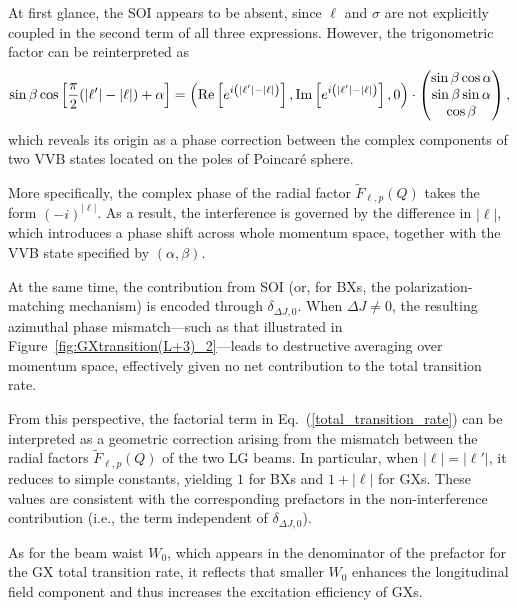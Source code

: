 At first glance, the SOI appears to be absent, since $\ell$ and $\sigma$ are not explicitly coupled in the second term of all three expressions. However, the trigonometric factor can be reinterpreted as
\begin{equation}
\sin\beta\cos\left[\frac{\pi}{2}(|\ell'|-|\ell|)+\alpha\right]
=
\begin{pmatrix}
{\rm Re}\left[e^{i\left(|\ell'|-|\ell|\right)}\right], 
{\rm Im}\left[e^{i\left(|\ell'|-|\ell|\right)}\right],
0
\end{pmatrix}
\cdot
\begin{pmatrix}
\sin\beta\cos\alpha\\
\sin\beta\sin\alpha\\
\cos\beta
\end{pmatrix},
\end{equation}
which reveals its origin as a phase correction between the complex components of two VVB states located on the poles of Poincar\'e sphere.

More specifically, the complex phase of the radial factor $\tilde{F}_{\ell,p}(Q)$ takes the form $(-i)^{|\ell|}$. As a result, the interference is governed by the difference in $|\ell|$, which introduces a phase shift across whole momentum space, together with the VVB state specified by $(\alpha,\beta)$.

At the same time, the contribution from SOI (or, for BXs, the polarization-matching mechanism) is encoded through $\delta_{\Delta J, 0}$. When $\Delta J \neq 0$, the resulting azimuthal phase mismatch—such as that illustrated in Figure~\ref{fig:GXtransition(L+3)_2}—leads to destructive averaging over momentum space, effectively given no net contribution to the total transition rate.

From this perspective, the factorial term in Eq.~(\ref{total_transition_rate}) can be interpreted as a geometric correction arising from the mismatch between the radial factors $\tilde{F}_{\ell,p}(Q)$ of the two LG beams. In particular, when $|\ell| = |\ell'|$, it reduces to simple constants, yielding $1$ for BXs and $1 + |\ell|$ for GXs. These values are consistent with the corresponding prefactors in the non-interference contribution (i.e., the term independent of $\delta_{\Delta J, 0}$).

As for the beam waist $W_0$, which appears in the denominator of the prefactor for the GX total transition rate, it reflects that smaller $W_0$ enhances the longitudinal field component and thus increases the excitation efficiency of GXs.

